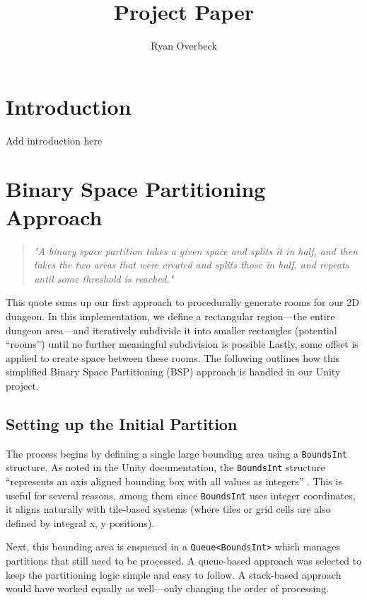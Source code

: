 \documentclass[a4paper, 12pt, one column, aas_macros]{article}
\title{Project Paper}
\author{Ryan Overbeck}
\begin{document}
\maketitle


\tableofcontents


\section{Introduction}
Add introduction here

\section{Binary Space Partitioning Approach}
\begin{quote}
  \emph{"A binary space partition takes a given space and splits it in half, and then takes the two areas that were created and splits those in half, and repeats until some threshold is reached."}
  \cite[p.~293]{ShortAdams2017}
\end{quote}

This quote sums up our first approach to procedurally generate rooms for our 2D dungeon. In this implementation, we define a rectangular region---the entire dungeon area---and iteratively subdivide it into smaller rectangles (potential ``rooms'') until no further meaningful subdivision is possible Lastly, some offset is applied to create space between these rooms. The following outlines how this simplified Binary Space Partitioning (BSP) approach is handled in our Unity project.

\subsection{Setting up the Initial Partition}
The process begins by defining a single large bounding area using a \texttt{BoundsInt} structure. As noted in the Unity documentation, the \texttt{BoundsInt} structure ``represents an axis aligned bounding box with all values as integers'' \citep{unity_docs}. This is useful for several reasons, among them since \texttt{BoundsInt} uses integer coordinates, it aligns naturally with tile-based systems (where tiles or grid cells are also defined by integral x, y positions).

Next, this bounding area is enqueued in a \texttt{Queue<BoundsInt>} which manages partitions that still need to be processed. A queue-based approach was selected to keep the partitioning logic simple and easy to follow. A stack-based approach would have worked equally as well---only changing the order of processing.
\end{document}
